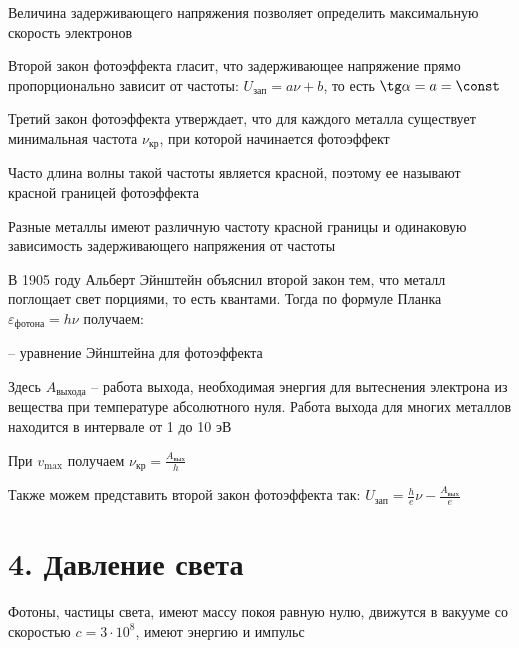 \documentclass[12pt]{article}
\begin{document}
Величина задерживающего напряжения позволяет определить максимальную скорость электронов

Второй закон фотоэффекта гласит, что задерживающее напряжение прямо пропорционально зависит от частоты: $U_\text{зап} = a\nu + b$, то есть $\tg \alpha = a = \const$

Третий закон фотоэффекта утверждает, что для каждого металла существует минимальная частота $\nu_{\text{кр}}$, при которой начинается фотоэффект

Часто длина волны такой частоты является красной, поэтому ее называют красной границей фотоэффекта

Разные металлы имеют различную частоту красной границы и одинаковую зависимость задерживающего напряжения от частоты

\mediumvspace

В 1905 году Альберт Эйнштейн объяснил второй закон тем, что металл поглощает свет порциями, то есть квантами. Тогда по формуле Планка $\varepsilon_{\text{фотона}} = h \nu$ получаем:

 -- уравнение Эйнштейна для фотоэффекта

\smallvspace

Здесь $A_{\text{выхода}}$ -- работа выхода, необходимая энергия для вытеснения электрона из вещества при температуре абсолютного нуля. Работа выхода для многих металлов находится в интервале от 1 до 10 эВ

При $v_{\max}$ получаем $\nu_\text{кр} = \frac{A_\text{вых}}{h}$

Также можем представить второй закон фотоэффекта так: $U_\text{зап} = \frac{h}{e} \nu - \frac{A_\text{вых}}{e}$








\section{4. Давление света}

Фотоны, частицы света, имеют массу покоя равную нулю, движутся в вакууме со скоростью $c = 3 \cdot 10^8$, имеют энергию и импульс
\end{document}
